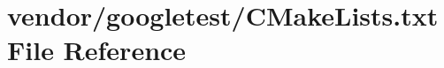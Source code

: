 \hypertarget{vendor_2googletest_2CMakeLists_8txt}{}\section{vendor/googletest/\+C\+Make\+Lists.txt File Reference}
\label{vendor_2googletest_2CMakeLists_8txt}
